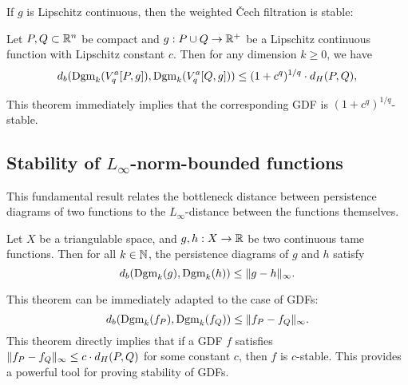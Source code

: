 If $g$ is Lipschitz continuous, then the weighted \v{C}ech filtration is stable:
\begin{theorem}
    Let $P, Q \subset \mathbb{R}^n$ be compact and $g : P \cup Q \to \mathbb{R}^+$ be a
    Lipschitz continuous function with Lipschitz constant $c$. Then for any
    dimension $k \geq 0$, we have
    \begin{equation}
        d_b(\operatorname{Dgm}_k(V^a_q[P, g]), \operatorname{Dgm}_k(V^a_q[Q, g])) \leq (1 + c^q)^{1/q} \cdot d_H(P, Q),
    \end{equation}
\end{theorem}
This theorem immediately implies that the corresponding GDF
is $(1 + c^q)^{1/q}$-stable.

\subsection{Stability of $L_\infty$-norm-bounded functions}

This fundamental result relates the bottleneck distance between persistence
diagrams of two functions to the $L_\infty$-distance between the functions
themselves.

\begin{theorem}
    Let $X$ be a triangulable space, and $g, h : X \to \mathbb{R}$ be two continuous
    tame functions. Then for all $k \in \mathbb{N}$, the persistence diagrams of $g$ and
    $h$ satisfy
    \begin{equation}
        d_b(\operatorname{Dgm}_k(g), \operatorname{Dgm}_k(h)) \leq \lVert g - h\rVert_{\infty}.
    \end{equation}
\end{theorem}
This theorem can be immediately adapted to the case of GDFs:
\begin{equation}
    d_b(\operatorname{Dgm}_k(f_P), \operatorname{Dgm}_k(f_Q)) \leq \lVert f_P - f_Q\rVert_{\infty}.
\end{equation}
This theorem directly implies that if a GDF $f$ satisfies
$\lVert f_P - f_Q\rVert_\infty \leq c \cdot d_H(P, Q)$ for some constant $c$, then
$f$ is $c$-stable. This provides a powerful tool for proving stability of GDFs.
